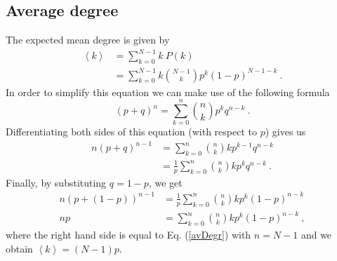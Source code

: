 \documentclass[11 pt , letterpaper , twoside , openright]{book}
\begin{document}
\subsection{Average degree}\label{degree}
The expected mean degree is given by \cite{Hopcroft2006}
\begin{equation}\label{avDegr}
\begin{split}
	\left<k\right> &= \sum_{k=0}^{N-1} k\  P(k)  \\
&= \sum_{k=0}^{N-1} k \binom{N-1}{k}p^k (1-p)^{N-1-k} \ .
\end{split}
\end{equation}
In order to simplify this equation we can make use of the following formula \cite{Hopcroft2006}
\begin{equation} 
	(p+q)^n = \sum_{k=0}^n \binom{n}{k} p^k q^{n-k} \ .
\end{equation}
Differentiating both sides of this equation (with respect to $p$) gives us \cite{Hopcroft2006}
\begin{equation}
\begin{split}
	n(p+q)^{n-1} &= \sum_{k=0}^n \binom{n}{k} k p^{k-1} q^{n-k} \\
	&= \frac{1}{p} \sum_{k=0}^n \binom{n}{k} k p^{k} q^{n-k} \ .
\end{split}
\end{equation}
Finally, by substituting $q = 1-p$, we get \cite{Hopcroft2006}
\begin{equation}
\begin{split}
	n (p+(1-p))^{n-1} &= \frac{1}{p} \sum_{k=0}^n \binom{n}{k} k p^{k} (1-p)^{n-k} \\
	np &= \sum_{k=0}^n \binom{n}{k} k p^{k} (1-p)^{n-k} \ ,
\end{split}
\end{equation}
where the right hand side is equal to Eq. (\ref{avDegr}) with $n = N-1$ and we obtain $\left<k\right> = (N-1)p$.
\end{document}
